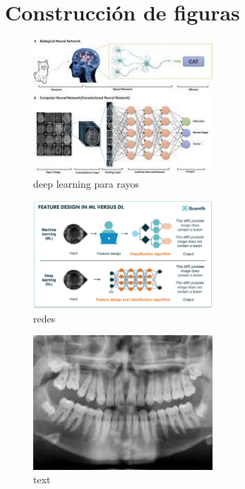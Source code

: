 \documentclass[]{article}
\begin{document}
\section{Construcción de figuras}	
\lipsum[2-5]
\begin{figure}[h]
	\centering
	\includegraphics[width=0.6\textwidth]{Figure/deepray.jpg}
	\caption{deep learning para rayos}
	\label{fig: deep}
	\end{figure}

\begin{figure}[h]
	\centering
	\includegraphics[width=0.6\textwidth]{Figure/redesray}
	\caption{redes}
	\label{fig: rede}
\end{figure}
\lipsum[2-5]

\begin{figure}[h]
	\centering
	\includegraphics[width=0.6\textwidth]{Figure/primera}
	\caption{text}
	\label{key}
\end{figure}
\end{document}
